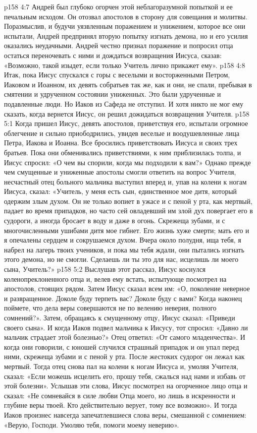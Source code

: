 \vs p158 4:7 Андрей был глубоко огорчен этой неблагоразумной попыткой и ее печальным исходом. Он отозвал апостолов в сторону для совещания и молитвы. Поразмыслив, и будучи уязвленным поражением и унижением, которое все они испытали, Андрей предпринял вторую попытку изгнать демона, но и его усилия оказались неудачными. Андрей честно признал поражение и попросил отца остаться переночевать с ними и дождаться возвращения Иисуса, сказав: «Возможно, такой изыдет, если только Учитель лично прикажет ему».
\vs p158 4:8 Итак, пока Иисус спускался с горы с веселыми и восторженными Петром, Иаковом и Иоанном, их девять собратьев так же, как и они, не спали, пребывая в смятении и удрученном состоянии униженных. Это были удрученные и подавленные люди. Но Иаков из Сафеда не отступил. И хотя никто не мог ему сказать, когда вернется Иисус, он решил дожидаться возвращения Учителя.
\vs p158 5:1 Когда пришел Иисус, девять апостолов, приветствуя его, испытали огромное облегчение и сильно приободрились, увидев веселые и воодушевленные лица Петра, Иакова и Иоанна. Все бросились приветствовать Иисуса и своих трех братьев. Пока они обменивались приветствиями, к ним приблизилась толпа, и Иисус спросил: «О чем вы спорили, когда мы подходили к вам?» Однако прежде чем смущенные и униженные апостолы смогли ответить на вопрос Учителя, несчастный отец больного мальчика выступил вперед и, упав на колени к ногам Иисуса, сказал: «Учитель, у меня есть сын, единственное мое дитя, который одержим злым духом. Он не только вопиет в ужасе и с пеной у рта, как мертвый, падает во время припадков, но часто сей овладевший им злой дух повергает его в судороги, а иногда бросает в воду и даже в огонь. Скрежеща зубами, и с многочисленными ушибами дитя мое гибнет. Его жизнь хуже смерти; мать его и я опечалены сердцем и сокрушаемся духом. Вчера около полудня, ища тебя, я набрел на лагерь твоих учеников, и пока мы тебя ждали, они пытались изгнать этого демона, но не смогли. Сделаешь ли ты это для нас, исцелишь ли моего сына, Учитель?»
\vs p158 5:2 Выслушав этот рассказ, Иисус коснулся коленопреклоненного отца и, велев ему встать, испытующе посмотрел на апостолов, стоящих рядом. Затем Иисус сказал всем им: «О, поколение неверное и развращенное. Доколе буду терпеть вас? Доколе буду с вами? Когда наконец поймете, что дела веры совершаются не по велению неверия, полного сомнений?». Затем, обращаясь к смущенному отцу, Иисус сказал: «Приведи своего сына». И когда Иаков подвел мальчика к Иисусу, тот спросил: «Давно ли мальчик страдает этой болезнью?» Отец ответил: «От самого младенчества». И когда они говорили, с юношей случился страшный припадок и он упал перед ними, скрежеща зубами и с пеной у рта. После жестоких судорог он лежал как мертвый. Тогда отец снова пал на колени к ногам Иисуса и, умоляя Учителя, сказал: «Если можешь исцелить его, прошу тебя, сжалься над нами и избавь от этой болезни». Услышав эти слова, Иисус посмотрел на огорченное лицо отца и сказал: «Не сомневайся в силе любви Отца моего, но лишь в искренности и глубине веры твоей. Кто действительно верует, тому все возможно». И тогда Иаков произнес навсегда запечатлевшиеся слова веры, смешанной с сомнением: «Верую, Господи. Умоляю тебя, помоги моему неверию».
